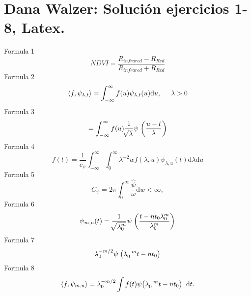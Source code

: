 \documentclass{article}
\begin{document}
\section{Dana Walzer: Solución ejercicios 1-8, Latex.}
\vspace{1cm} Formula 1\\
\begin{equation} NDVI=\frac{R_{infrared}-R_{Red}}{R_{infrared}+R_{Red}}     \end{equation}
Formula 2\\
\begin{equation} \langle f, \psi_{\lambda,t} \rangle = \int^{\infty}_{-\infty} f(u)\psi_{\lambda,t}(u) \mathrm{d}u, \hspace{0.5cm} \lambda>0 \end{equation}
Formula 3\\
\begin{equation} =\int^{\infty}_{-\infty} f(u) \frac{1}{\sqrt[]{\lambda}} \psi \hspace{0.1cm} \bigg( \frac{u-t}{\lambda} \bigg)  \end{equation}
Formula 4 \\
\begin{equation} f(t)=\frac{1}{c_\psi} \int^{\infty}_{-\infty} \int^{\infty}_{0} \lambda^{-2} wf(\lambda,u) \psi_{\lambda,u}(t) \mathrm{d}\lambda \mathrm{d}u\end{equation}
Formula 5\\
\begin{equation} C_{\psi}=2\pi \int^{\infty}_{0} \frac{\hat{\psi}}{\omega} \mathrm{d}w<\infty,\end{equation}
Formula 6\\
\begin{equation} \psi_{m,n}(t)=\frac{1}{\sqrt[]{\lambda_{0}^{m}}}\psi \hspace{0.1cm} \bigg(\frac{t-nt_{0} \lambda^{m}_{0}}{\lambda^{m}_{0}}\bigg) \end{equation}
Formula 7\\
\begin{equation} \lambda^{-m/2}_{0} \psi \hspace{0.1cm} \big( \lambda^{-m}_{0}t-nt_{0} \big) \end{equation}
Formula 8\\
\begin{equation} \langle f, \psi_{m,n} \rangle = \lambda^{-m/2}_{0} \int f(t) \psi \big(\lambda^{-m}_{0}t-nt_{0} \big)\hspace{0.2cm} \mathrm{d}t. \end{equation}
\end{document}
